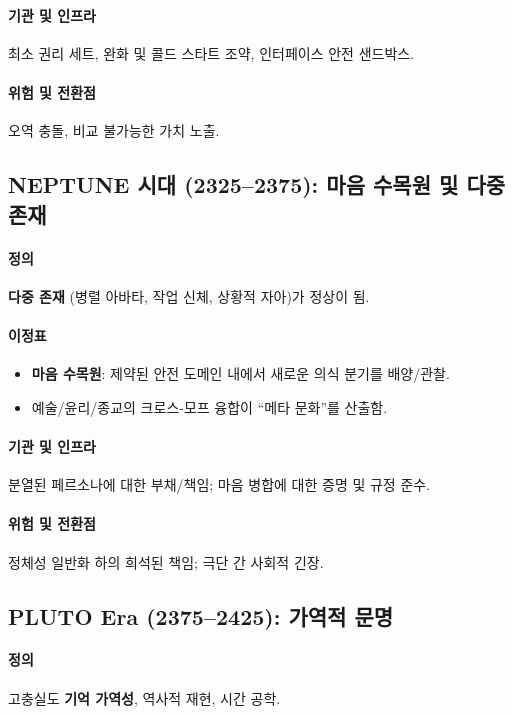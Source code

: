 \documentclass[11pt]{article}
\begin{document}
\paragraph{기관 및 인프라} 최소 권리 세트, 완화 및 콜드 스타트 조약, 인터페이스 안전 샌드박스.

\paragraph{위험 및 전환점} 오역 충돌, 비교 불가능한 가치 노출.

\subsection{NEPTUNE 시대 (2325–2375): 마음 수목원 및 다중 존재}
\paragraph{정의} \textbf{다중 존재} (병렬 아바타, 작업 신체, 상황적 자아)가 정상이 됨.

\paragraph{이정표}
\begin{itemize}[noitemsep]
  \item \textbf{마음 수목원}: 제약된 안전 도메인 내에서 새로운 의식 분기를 배양/관찰.
  \item 예술/윤리/종교의 크로스-모프 융합이 ``메타 문화''를 산출함.
\end{itemize}

\paragraph{기관 및 인프라} 분열된 페르소나에 대한 부채/책임; 마음 병합에 대한 증명 및 규정 준수.

\paragraph{위험 및 전환점} 정체성 일반화 하의 희석된 책임; 극단 간 사회적 긴장.

\subsection{PLUTO Era (2375–2425): 가역적 문명}
\paragraph{정의} 고충실도 \textbf{기억 가역성}, 역사적 재현, 시간 공학.
\end{document}
